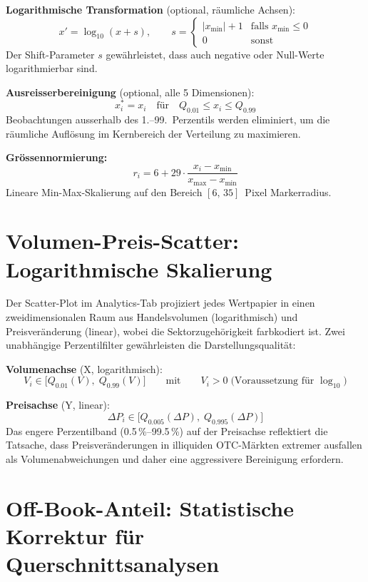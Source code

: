 \documentclass[11pt, a4paper, oneside, openany]{report}
\begin{document}
\begin{mathbox}
\textbf{Logarithmische Transformation} (optional, räumliche Achsen):
\[
  x' = \log_{10}(x + s), \qquad s = \begin{cases} |x_{\min}| + 1 & \text{falls } x_{\min} \leq 0 \\ 0 & \text{sonst} \end{cases}
\]
Der Shift-Parameter $s$ gewährleistet, dass auch negative oder Null-Werte logarithmierbar sind.

\textbf{Ausreisserbereinigung} (optional, alle 5 Dimensionen):
\[
  x_i^* = x_i \quad \text{für} \quad Q_{0.01} \leq x_i \leq Q_{0.99}
\]
Beobachtungen ausserhalb des 1.--99.~Perzentils werden eliminiert, um die räumliche Auflösung im Kernbereich der Verteilung zu maximieren.

\textbf{Grössennormierung:}
\[
  r_i = 6 + 29 \cdot \frac{x_i - x_{\min}}{x_{\max} - x_{\min}}
\]
Lineare Min-Max-Skalierung auf den Bereich $[6,\,35]$~Pixel Markerradius.
\end{mathbox}

\section{Volumen-Preis-Scatter: Logarithmische Skalierung}
\label{sec:scatter}

Der Scatter-Plot im Analytics-Tab projiziert jedes Wertpapier in einen zweidimensionalen Raum aus Handelsvolumen (logarithmisch) und Preisveränderung (linear), wobei die Sektorzugehörigkeit farbkodiert ist. Zwei unabhängige Perzentilfilter gewährleisten die Darstellungsqualität:

\begin{mathbox}
\textbf{Volumenachse} (X, logarithmisch):
\[
  V_i \in \bigl[Q_{0.01}(V),\; Q_{0.99}(V)\bigr] \qquad \text{mit} \qquad V_i > 0 \;\text{(Voraussetzung für } \log_{10}\text{)}
\]

\textbf{Preisachse} (Y, linear):
\[
  \Delta P_i \in \bigl[Q_{0.005}(\Delta P),\; Q_{0.995}(\Delta P)\bigr]
\]
Das engere Perzentilband (0.5\,\%--99.5\,\%) auf der Preisachse reflektiert die Tatsache, dass Preisveränderungen in illiquiden OTC-Märkten extremer ausfallen als Volumenabweichungen und daher eine aggressivere Bereinigung erfordern.
\end{mathbox}

\section{Off-Book-Anteil: Statistische Korrektur für Querschnittsanalysen}
\label{sec:offbook}
\end{document}
